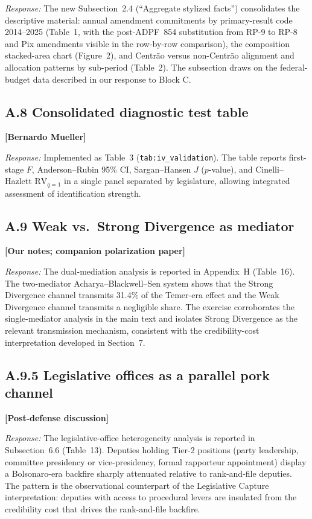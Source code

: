 \documentclass[11pt]{article}
\newcommand{\committee}[1]{\textbf{[#1]}}
\begin{document}
\noindent\emph{Response:} The new Subsection~2.4 (``Aggregate stylized
facts'') consolidates the descriptive material: annual amendment
commitments by primary-result code 2014--2025 (Table~1, with the
post-ADPF~854 substitution from RP-9 to RP-8 and Pix amendments
visible in the row-by-row comparison), the composition stacked-area
chart (Figure~2), and Centrão versus non-Centrão alignment and
allocation patterns by sub-period (Table~2). The subsection draws on
the federal-budget data described in our response to Block C.

\subsection*{A.8 \quad Consolidated diagnostic test table}
\committee{Bernardo Mueller}

\noindent\emph{Response:} Implemented as Table~3 (\texttt{tab:iv\_validation}).
The table reports first-stage $F$, Anderson--Rubin 95\% CI,
Sargan--Hansen $J$ ($p$-value), and Cinelli--Hazlett $\text{RV}_{q=1}$
in a single panel separated by legislature, allowing integrated
assessment of identification strength.

\subsection*{A.9 \quad Weak vs.\ Strong Divergence as mediator}
\committee{Our notes; companion polarization paper}

\noindent\emph{Response:} The dual-mediation analysis is reported in
Appendix~H (Table~16). The two-mediator Acharya--Blackwell--Sen system
shows that the Strong Divergence channel transmits 31.4\% of the
Temer-era effect and the Weak Divergence channel transmits a
negligible share. The exercise corroborates the single-mediator
analysis in the main text and isolates Strong Divergence as the
relevant transmission mechanism, consistent with the
credibility-cost interpretation developed in Section~7.

\subsection*{A.9.5 \quad Legislative offices as a parallel pork channel}
\committee{Post-defense discussion}

\noindent\emph{Response:} The legislative-office heterogeneity analysis is
reported in Subsection~6.6 (Table~13). Deputies holding Tier-2
positions (party leadership, committee presidency or vice-presidency,
formal rapporteur appointment) display a Bolsonaro-era backfire
sharply attenuated relative to rank-and-file deputies. The pattern is
the observational counterpart of the Legislative Capture
interpretation: deputies with access to procedural levers are insulated
from the credibility cost that drives the rank-and-file backfire.
\end{document}
